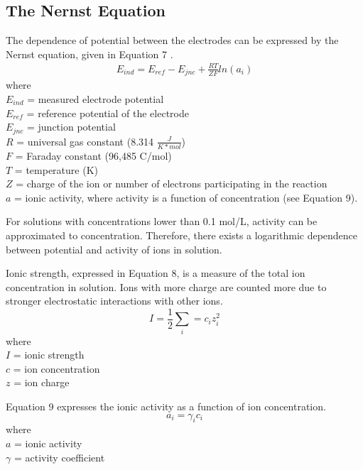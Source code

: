 \documentclass[journal=jacsat,manuscript=article,layout=twocolumn]{achemso}
\begin{document}
\subsection {The Nernst Equation}
The dependence of potential between the electrodes can be expressed by the Nernst
equation, given in Equation 7 \cite{lab_man}.
\begin{equation}
    \begin {aligned}
    E_{ind} = E_{ref} - E_{jnc} + \frac{RT}{ZF}ln(a_i)
    \end {aligned}
\end{equation}
where \\
$E_{ind}$ = measured electrode potential \\
$E_{ref}$ = reference potential of the electrode \\
$E_{jnc}$ = junction potential \\
$R$ = universal gas constant (8.314 $\frac{J}{K*mol}$) \\
$F$ = Faraday constant (96,485 C/mol) \\
$T$ = temperature (K) \\
$Z$ = charge of the ion or number of electrons participating in the reaction \\
$a$ = ionic activity, where activity is a function of concentration (see
Equation 9).

For solutions with concentrations lower than 0.1 mol/L, activity can be 
approximated to concentration. Therefore, there exists a logarithmic
dependence between potential and activity of ions in solution.

Ionic strength, expressed in Equation 8, is a measure of the total ion concentration in solution. Ions
with more charge are counted more due to stronger electrostatic interactions
with other ions.
\begin{equation}
    I = \frac{1}{2}\sum_i = c_iz_i^2
\end{equation}
where \\
$I$ = ionic strength \\
$c$ = ion concentration \\
$z$ = ion charge

Equation 9 expresses the ionic activity as a function of ion concentration.
\begin{equation}
    a_i = \gamma_ic_i
\end{equation}
where \\
$a$ = ionic activity \\
$\gamma$ = activity coefficient
\end{document}
